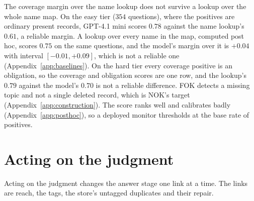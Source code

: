 \documentclass{article}
\begin{document}
The coverage margin over the name lookup does not survive a lookup over the whole name map.
On the easy tier ($354$ questions), where the positives are ordinary present records, GPT-4.1 mini scores $0.78$ against the name lookup's $0.61$, a reliable margin.
A lookup over every name in the map, computed post hoc, scores $0.75$ on the same questions, and the model's margin over it is $+0.04$ with interval $[-0.01,+0.09]$, which is not a reliable one (Appendix~\ref{app:baselines}).
On the hard tier every coverage positive is an obligation, so the coverage and obligation scores are one row, and the lookup's $0.79$ against the model's $0.70$ is not a reliable difference.
FOK detects a missing topic and not a single deleted record, which is NOK's target (Appendix~\ref{app:construction}).
The score ranks well and calibrates badly (Appendix~\ref{app:posthoc}), so a deployed monitor thresholds at the base rate of positives.

\section{Acting on the judgment}\label{sec:downstream}

Acting on the judgment changes the answer stage one link at a time.
The links are reach, the tags, the store's untagged duplicates and their repair.
\end{document}
